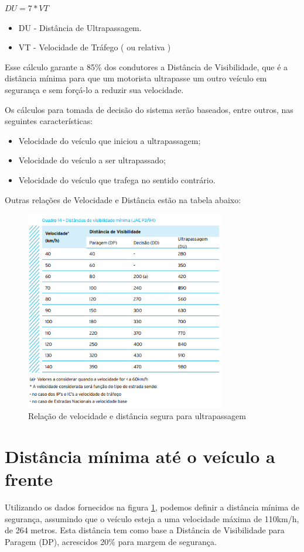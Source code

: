 $DU = 7*VT$
\begin{itemize}
  \item DU - Distância de Ultrapassagem.
  \item VT - Velocidade de Tráfego ( ou relativa )
\end{itemize}

Esse cálculo garante a 85\% dos condutores a Distância de Visibilidade, que é a distância mínima para
que um motorista ultrapasse um outro veículo em segurança e sem forçá-lo a reduzir sua velocidade. \cite{costa}

Os cálculos para tomada de decisão do sistema serão baseados, entre outros, nas seguintes características:

\begin{itemize}
  \item Velocidade do veículo que iniciou a ultrapassagem;
  \item Velocidade do veículo a ser ultrapassado;
  \item Velocidade do veículo que trafega no sentido contrário.
\end{itemize}

Outras relações de Velocidade e Distância estão na tabela abaixo:
\begin{figure}[h]
  \centering
  \includegraphics[width=330px, scale=0.5]{figuras/visibilidade}
  \caption{Relação de velocidade e distância segura para ultrapassagem}
  \label{fig:visibilidade}
\end{figure}

\section{Distância mínima até o veículo a frente}
Utilizando os dados fornecidos na figura \ref{fig:visibilidade}, podemos definir a distância mínima de
segurança, assumindo que o veículo esteja a uma velocidade máxima de 110km/h, de 264 metros. Esta distância
tem como base a Distância de Visibilidade para Paragem (DP), acrescidos 20\% para margem de segurança.

